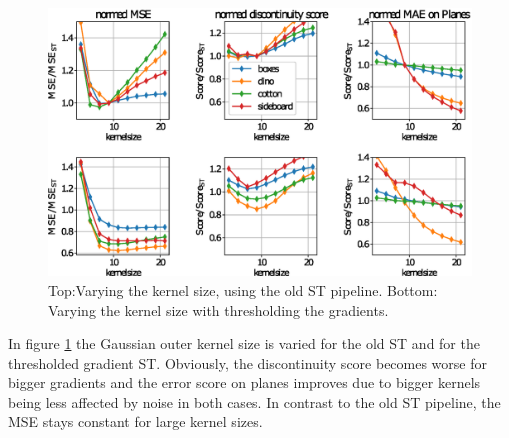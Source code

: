 \documentclass  [
  paper    = a4,
  BCOR     = 10mm,
  twoside,
  fontsize = 12pt,
  fleqn,
  toc      = bibnumbered,
  toc      = listofnumbered,
  numbers  = noendperiod,
  headings = normal,
  listof   = leveldown,
  version  = 3.03
]                                       {scrreprt}
\begin{document}
\begin{figure}[h!]
	\centering
	\includegraphics[width=0.8\linewidth]{images/old_outer}
	\caption[Varying kernel size]{Top:Varying the kernel size, using the old ST pipeline. Bottom: Varying the kernel size with thresholding the gradients.}
	\label{fig:oldouter}
\end{figure}
In figure \ref{fig:oldouter} the Gaussian outer kernel size is varied for the old ST and for the thresholded gradient ST. Obviously, the discontinuity score becomes worse for bigger gradients and the error score on planes improves due to bigger kernels being less affected by noise in both cases. In contrast to the old ST pipeline, the MSE stays constant for large kernel sizes.
\end{document}

